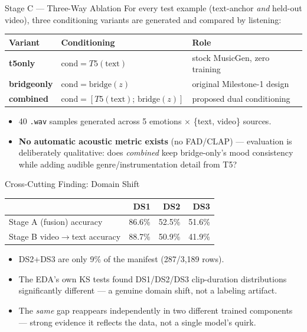 \documentclass[aspectratio=169,11pt]{beamer}
\begin{document}
\begin{frame}{Stage C --- Three-Way Ablation}
For every test example (text-anchor \emph{and} held-out video), three conditioning variants are
generated and compared by listening:
\begin{center}
\begin{tabular}{@{}lll@{}}
\toprule
Variant & Conditioning & Role \\
\midrule
\textbf{t5only} & $\text{cond}=T5(\text{text})$ & stock MusicGen, zero training \\
\textbf{bridgeonly} & $\text{cond}=\text{bridge}(z)$ & original Milestone-1 design \\
\textbf{combined} & $\text{cond}=[T5(\text{text});\,\text{bridge}(z)]$ & proposed dual conditioning \\
\bottomrule
\end{tabular}
\end{center}
\vspace{3mm}
\begin{itemize}
  \item 40 \texttt{.wav} samples generated across 5 emotions $\times$ \{text, video\} sources.
  \item \textbf{No automatic acoustic metric exists} (no FAD/CLAP) --- evaluation is deliberately
  qualitative: does \emph{combined} keep bridge-only's mood consistency while adding audible
  genre/instrumentation detail from T5?
\end{itemize}
\end{frame}

\begin{frame}{Cross-Cutting Finding: Domain Shift}
\begin{center}
\begin{tabular}{@{}lrrr@{}}
\toprule
 & DS1 & DS2 & DS3 \\
\midrule
Stage A (fusion) accuracy & 86.6\% & 52.5\% & 51.6\% \\
Stage B video$\to$text accuracy & 88.7\% & 50.9\% & 41.9\% \\
\bottomrule
\end{tabular}
\end{center}
\vspace{3mm}
\begin{itemize}
  \item DS2+DS3 are only 9\% of the manifest (287/3{,}189 rows).
  \item The EDA's own KS tests found DS1/DS2/DS3 clip-duration distributions significantly
  different --- a genuine domain shift, not a labeling artifact.
  \item The \emph{same} gap reappears independently in two different trained components ---
  strong evidence it reflects the data, not a single model's quirk.
\end{itemize}
\end{frame}
\end{document}
